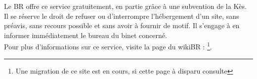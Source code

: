 Le BR offre ce service gratuitement, en partie grâce à une subvention de la Kès.
Il se réserve le droit de refuser ou d'interrompre l'hébergement d'un site, sans préavis, sans recours possible et sans avoir à fournir de motif.
Il s'engage à en informer immédiatement le bureau du binet concerné.\\
Pour plus d'informations sur ce service, visite la page du wikiBR : \newline {}\footnote{Une migration de ce site est en cours, si cette page à disparu consulte }.
